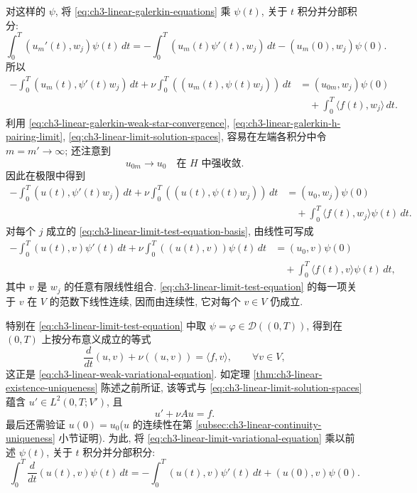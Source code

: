 \hypertarget{chapter-03-page-190}{}
对这样的 $\psi$, 将 \eqref{eq:ch3-linear-galerkin-equations} 乘 $\psi(t)$, 关于 $t$ 积分并分部积分:
\[
\int_0^T(u_m'(t),w_j)\psi(t)\,dt
=-\int_0^T(u_m(t)\psi'(t),w_j)\,dt
-(u_m(0),w_j)\psi(0).
\]
所以
\begin{equation}
\begin{aligned}
-\int_0^T(u_m(t),\psi'(t)w_j)\,dt
+\nu\int_0^T((u_m(t),\psi(t)w_j))\,dt
&=(u_{0m},w_j)\psi(0)\\
&\quad+\int_0^T\langle f(t),w_j\rangle\,dt.
\end{aligned}
\label{eq:ch3-linear-galerkin-integrated-test-equation}
\end{equation}
利用 \eqref{eq:ch3-linear-galerkin-weak-star-convergence}, \eqref{eq:ch3-linear-galerkin-h-pairing-limit}, \eqref{eq:ch3-linear-limit-solution-spaces}, 容易在左端各积分中令 $m=m'\to\infty$; 还注意到
\begin{equation}
u_{0m}\longrightarrow u_0\quad\text{在 }H\text{ 中强收敛}.
\label{eq:ch3-linear-initial-projection-convergence}
\end{equation}
因此在极限中得到
\begin{equation}
\begin{aligned}
-\int_0^T(u(t),\psi'(t)w_j)\,dt
+\nu\int_0^T((u(t),\psi(t)w_j))\,dt
&=(u_0,w_j)\psi(0)\\
&\quad+\int_0^T\langle f(t),w_j\rangle\psi(t)\,dt.
\end{aligned}
\label{eq:ch3-linear-limit-test-equation-basis}
\end{equation}
对每个 $j$ 成立的 \eqref{eq:ch3-linear-limit-test-equation-basis}, 由线性可写成
\begin{equation}
\begin{aligned}
-\int_0^T(u(t),v)\psi'(t)\,dt
+\nu\int_0^T((u(t),v))\psi(t)\,dt
&=(u_0,v)\psi(0)\\
&\quad+\int_0^T\langle f(t),v\rangle\psi(t)\,dt,
\end{aligned}
\label{eq:ch3-linear-limit-test-equation}
\end{equation}
其中 $v$ 是 $w_j$ 的任意有限线性组合. \eqref{eq:ch3-linear-limit-test-equation} 的每一项关于 $v$ 在 $V$ 的范数下线性连续, 因而由连续性, 它对每个 $v\in V$ 仍成立.

特别在 \eqref{eq:ch3-linear-limit-test-equation} 中取 $\psi=\varphi\in\mathcal D((0,T))$, 得到在 $(0,T)$ 上按分布意义成立的等式
\begin{equation}
\frac d{dt}(u,v)+\nu((u,v))=\langle f,v\rangle,
\qquad\forall v\in V,
\label{eq:ch3-linear-limit-variational-equation}
\end{equation}
这正是 \eqref{eq:ch3-linear-weak-variational-equation}. 如定理 \ref{thm:ch3-linear-existence-uniqueness} 陈述之前所证, 该等式与 \eqref{eq:ch3-linear-limit-solution-spaces} 蕴含 $u'\in L^2(0,T;V')$, 且
\begin{equation}
u'+\nu Au=f.
\label{eq:ch3-linear-limit-abstract-equation}
\end{equation}
最后还需验证 $u(0)=u_0$($u$ 的连续性在第 \ref{subsec:ch3-linear-continuity-uniqueness} 小节证明). 为此, 将 \eqref{eq:ch3-linear-limit-variational-equation} 乘以前述 $\psi(t)$, 关于 $t$ 积分并分部积分:
\[
\int_0^T\frac d{dt}(u(t),v)\psi(t)\,dt
=-\int_0^T(u(t),v)\psi'(t)\,dt
+(u(0),v)\psi(0).
\]

